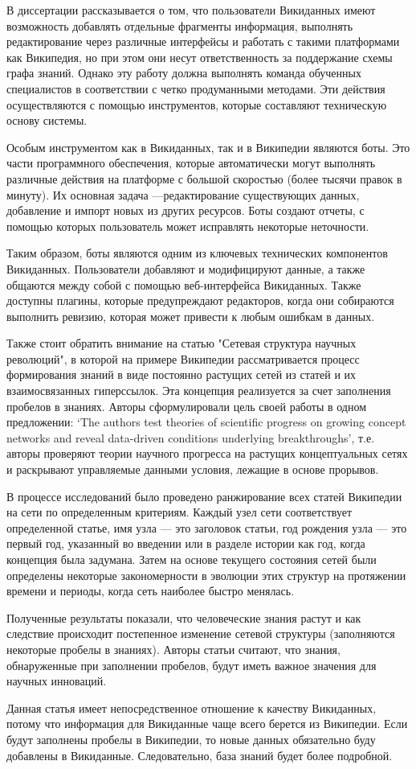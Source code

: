 В диссертации рассказывается о том, что пользователи Викиданных имеют возможность добавлять отдельные фрагменты информация, выполнять редактирование через различные интерфейсы и работать с такими платформами как Википедия, но при этом они несут ответственность за поддержание схемы графа знаний. Однако эту работу должна выполнять команда обученных специалистов в соответствии с четко продуманными методами. Эти действия осуществляются с помощью инструментов, которые составляют техническую основу системы.

Особым инструментом как в Викиданных, так и в Википедии являются боты. Это части программного обеспечения, которые автоматически могут выполнять различные действия на платформе с большой скоростью (более тысячи правок в минуту). Их основная задача ---редактирование существующих данных, добавление и импорт новых из других ресурсов. Боты создают отчеты, с помощью которых пользователь может исправлять некоторые неточности. 

Таким образом, боты являются одним из ключевых технических компонентов Викиданных. Пользователи добавляют и модифицируют данные, а также общаются между собой с помощью веб-интерфейса Викиданных. Также доступны плагины, которые предупреждают редакторов, когда они собираются выполнить ревизию, которая может привести к любым ошибкам в данных.

Также стоит обратить внимание на статью "Сетевая структура научных революций", в которой на примере Википедии рассматривается процесс формирования знаний в виде постоянно растущих сетей из статей и их взаимосвязанных гиперссылок. Эта концепция реализуется за счет заполнения пробелов в знаниях. Авторы сформулировали цель своей работы в одном предложении: ‘The authors test theories of scientific progress on growing concept networks and reveal data-driven conditions underlying breakthroughs’, т.е. авторы проверяют теории научного прогресса на растущих концептуальных сетях и раскрывают управляемые данными условия, лежащие в основе прорывов\cite{Network_structure_revolutions}. 

В процессе исследований было проведено ранжирование всех статей Википедии на сети по определенным критериям. Каждый узел сети соответствует определенной статье, имя узла --- это заголовок статьи, год рождения узла --- это первый год, указанный во введении или в разделе истории как год, когда концепция была задумана. Затем на основе текущего состояния сетей были определены некоторые закономерности в эволюции этих структур на протяжении времени и периоды, когда сеть наиболее быстро менялась.

Полученные результаты показали, что человеческие знания растут и как следствие происходит постепенное изменение сетевой структуры (заполняются некоторые пробелы в знаниях). Авторы статьи считают, что знания, обнаруженные при заполнении пробелов, будут иметь важное значения для научных инноваций. 

Данная статья имеет непосредственное отношение к качеству Викиданных, потому что информация для Викиданные чаще всего берется из Википедии. Если будут заполнены пробелы в Википедии, то новые данных обязательно буду добавлены в Викиданные. Следовательно, база знаний будет более подробной.
